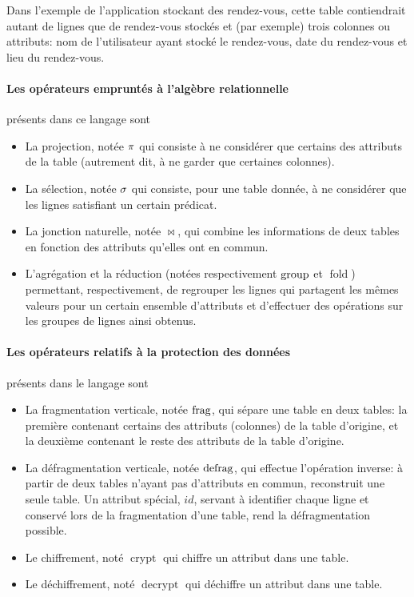 Dans l'exemple de l'application stockant des rendez-vous, cette
table contiendrait autant de lignes que de rendez-vous stockés 
et (par exemple) trois colonnes ou attributs: 
nom de l'utilisateur
ayant stocké le rendez-vous, date du rendez-vous et lieu du rendez-vous.

\paragraph{Les opérateurs empruntés à l'algèbre relationnelle}
présents dans ce langage sont
\begin{itemize}
	\item La projection, notée $\proj$ 
	qui consiste à ne considérer que certains des attributs de la table (autrement dit,
	à ne garder que certaines colonnes).
	\item La sélection, notée $\sel$
	qui consiste, pour une table donnée, à ne considérer que
	les lignes satisfiant un certain prédicat.
	\item La jonction naturelle, notée $\Join$, qui combine
	les informations de deux tables en fonction des attributs qu'elles ont
	en commun.
	\item L'agrégation et la réduction
	(notées respectivement $\operatorname{group}$ et $\operatorname{fold}$)
	permettant, respectivement, 
	de regrouper les lignes qui partagent les mêmes valeurs
	pour un certain ensemble d'attributs
	et d'effectuer des opérations sur les groupes de lignes ainsi obtenus.
\end{itemize}

\paragraph{Les opérateurs relatifs à la protection des données}
présents dans le langage sont
\begin{itemize}
	\item La fragmentation verticale, notée $\operatorname{frag}$,
	qui sépare une table en deux tables: la première contenant certains
	des attributs (colonnes) de la table d'origine, et la deuxième contenant
	le reste des attributs de la table d'origine.
	
	\item La défragmentation verticale, notée $\operatorname{defrag}$,
	qui effectue l'opération inverse: à partir de deux
	tables n'ayant pas d'attributs en commun, reconstruit une seule table.
	Un attribut spécial, $id$, servant à identifier chaque ligne et conservé lors de 
	la fragmentation d'une table, rend la défragmentation possible.
	
	\item Le chiffrement, noté $\operatorname{crypt}$
	qui chiffre un attribut dans une table.
	
	\item Le déchiffrement, noté $\operatorname{decrypt}$
	qui déchiffre un attribut dans une table.
\end{itemize}

